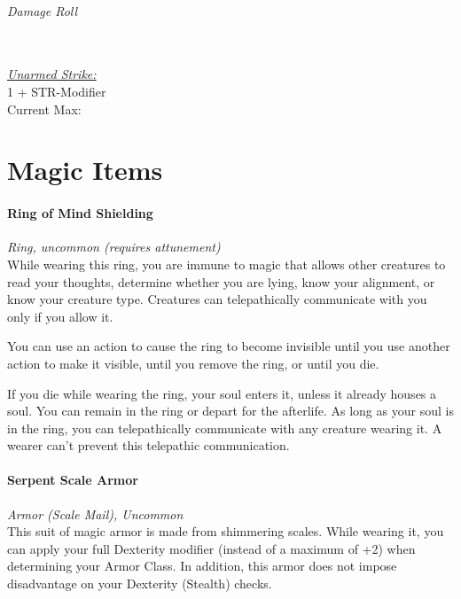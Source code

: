 \documentclass[letterpaper,openany,oneside,twocolumn]{book}
\newcommand{\PATH}{../../../}
\begin{document}
\paragraph*{Damage Roll}\hfill\\
\underline{\textit{Unarmed Strike:}}\\
1 + STR-Modifier\\
\indent Current Max: 

\part*{Magic Items}



\newpage
\subsection*{Ring of Mind Shielding}
\textit{Ring, uncommon (requires attunement)}\\
While wearing this ring, you are immune to magic that allows other creatures to read your thoughts, determine whether you are lying, know your alignment, or know your creature type. Creatures can telepathically communicate with you only if you allow it.

You can use an action to cause the ring to become invisible until you use another action to make it visible, until you remove the ring, or until you die.

If you die while wearing the ring, your soul enters it, unless it already houses a soul. You can remain in the ring or depart for the afterlife. As long as your soul is in the ring, you can telepathically communicate with any creature wearing it. A wearer can't prevent this telepathic communication.

\subsection*{Serpent Scale Armor}
\textit{Armor (Scale Mail), Uncommon}\\
This suit of magic armor is made from shimmering scales. While wearing it, you can apply your full Dexterity modifier (instead of a maximum of +2) when determining your Armor Class. In addition, this armor does not impose disadvantage on your Dexterity (Stealth) checks.
\end{document}
